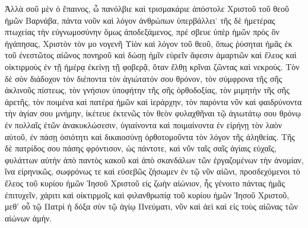Ἀλλὰ σοῦ μὲν ὁ ἔπαινος, ὦ πανόλβιε καὶ τρισμακάριε
ἀπόστολε Χριστοῦ τοῦ θεοῦ ἡμῶν Βαρνάβα, πάντα νοῦν
καὶ λόγον ἀνθρώπων ὑπερβάλλει˙ τῆς δὲ ἡμετέρας
πτωχείας τὴν εὐγνωμοσύνην ὅμως ἀποδεξάμενος, πρέ%
σβευε ὑπὲρ ἡμῶν πρὸς ὃν ἠγάπησας, Χριστὸν τὸν μο%
νογενῆ Υἱὸν καὶ λόγον τοῦ θεοῦ, ὅπως ῥύσηται ἡμᾶς
ἐκ τοῦ ἐνεστῶτος αἰῶνος πονηροῦ καὶ δώσῃ ἡμῖν εὑρεῖν
ἄφεσιν ἁμαρτιῶν καὶ ἔλεος καὶ οἰκτιρμοὺς ἐν τῇ ἡμέρᾳ
ἐκείνῃ τῇ φοβερᾷ, ὅταν ἔλθῃ κρῖναι ζῶντας καὶ νεκρούς.
Τὸν δὲ σὸν διάδοχον τὸν διέποντα τὸν ἁγιώτατόν σου
θρόνον, τὸν σύμφρονα τῆς σῆς ἀκλινοῦς πίστεως, τὸν
γνήσιον ὑποφήτην τῆς σῆς ὀρθοδοξίας, τὸν μιμητὴν τῆς
σῆς ἀρετῆς, τὸν ποιμένα καὶ πατέρα ἡμῶν καὶ ἱεράρχην,
τὸν παρόντα νῦν καὶ φαιδρύνοντα τὴν ἁγίαν σου μνήμην,
ἱκέτευε ἐκτενῶς τὸν θεὸν φυλαχθῆναι τῷ ἁγιωτάτῳ σου
θρόνῳ ἐν πολλαῖς ἐτῶν ἀνακυκλώσεσιν, ὑγιαίνοντα καὶ
ποιμαίνοντα ἐν εἰρήνῃ τὸν λαὸν αὐτοῦ, ἐν πάσῃ ὁσιότητι
καὶ δικαιοσύνῃ ὀρθοτομοῦντα τὸν λόγον τῆς ἀληθείας.
Τῆς δὲ πατρίδος σου πάσης φρόντισον, ὡς πάντοτε, καὶ
νῦν ταῖς σαῖς ἁγίαις εὐχαῖς, φυλάττων αὐτὴν ἀπὸ παντὸς
κακοῦ καὶ ἀπὸ σκανδάλων τῶν ἐργαζομένων τὴν ἀνομίαν,
ἵνα εἰρηνικῶς, σωφρόνως τε καὶ εὐσεβῶς ζήσωμεν ἐν
τῷ νῦν αἰῶνι, προσδεχόμενοι τὸ ἔλεος τοῦ κυρίου ἡμῶν
Ἰησοῦ Χριστοῦ εἰς ζωὴν αἰώνιον, ἧς γένοιτο πάντας
ἡμᾶς ἐπιτυχεῖν, χάριτι καὶ οἰκτιρμοῖς καὶ φιλανθρωπίᾳ
τοῦ κυρίου ἡμῶν Ἰησοῦ Χριστοῦ, μεθ’ οὗ τῷ Πατρὶ ἡ
δόξα σὺν τῷ ἁγίῳ Πνεύματι, νῦν καὶ ἀεὶ καὶ εἰς τοὺς
αἰῶνας τῶν αἰώνων ἀμήν.


